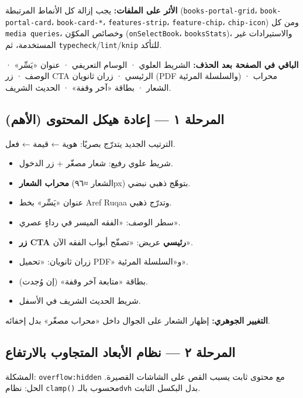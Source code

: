 \documentclass[11pt]{article}
\newcommand{\code}[1]{\textcolor{darkbg}{\texttt{\small #1}}}
\begin{document}
\begin{riskbox}
\textbf{الأثر على الملفات:} يجب إزالة كل الأنماط المرتبطة (\code{books-portal-grid}، \code{book-portal-card}، \code{book-card-*}، \code{features-strip}، \code{feature-chip}، \code{chip-icon}) ومن كل \code{media queries}، وخصائص المكوّن (\code{onSelectBook}، \code{booksStats})، والاستيرادات غير المستخدمة، ثم \code{typecheck}/\code{lint}/\code{knip} للتأكد.
\end{riskbox}

\begin{okbox}
\textbf{الباقي في الصفحة بعد الحذف:} الشريط العلوي · الوسام التعريفي · عنوان «يَسِّر» · الوصف · زر CTA الرئيسي · زران ثانويان (PDF والسلسلة المرئية) · محراب الشعار · بطاقة «آخر وقفة» · الحديث الشريف.
\end{okbox}

\subsection{المرحلة ١ — إعادة هيكل المحتوى (الأهم)}
الترتيب الجديد يتدرّج بصريًا: هوية ← قيمة ← فعل.

\begin{tcolorbox}[colback=softgray, colframe=gold, boxrule=0.6pt, arc=3pt, left=10pt, right=10pt]
\small\raggedleft
\begin{itemize}[label={\textcolor{gold}{\textbullet}}, leftmargin=1.4em, itemsep=1pt]
\item شريط علوي رفيع: شعار مصغّر + زر الدخول.
\item \textbf{محراب الشعار} (الشعار ≈٩٦px) بتوهّج ذهبي نبضي.
\item عنوان «يَسِّر» بخط Aref Ruqaa وتدرّج ذهبي.
\item سطر الوصف: «الفقه الميسر في رداءٍ عصري».
\item \textbf{زر CTA رئيسي} عريض: «تصفّح أبواب الفقه الآن».
\item زران ثانويان: «تحميل PDF» و«السلسلة المرئية».
\item بطاقة «متابعة آخر وقفة» (إن وُجدت).
\item شريط الحديث الشريف في الأسفل.
\end{itemize}
\end{tcolorbox}

\begin{okbox}
\textbf{التغيير الجوهري:} إظهار الشعار على الجوال داخل «محراب مصغّر» بدل إخفائه.
\end{okbox}

\subsection{المرحلة ٢ — نظام الأبعاد المتجاوب بالارتفاع}
المشكلة: \code{overflow:hidden} مع محتوى ثابت يسبب القص على الشاشات القصيرة.
الحل: نظام \code{clamp()} محسوب بالـ\code{dvh} بدل البكسل الثابت.
\end{document}
